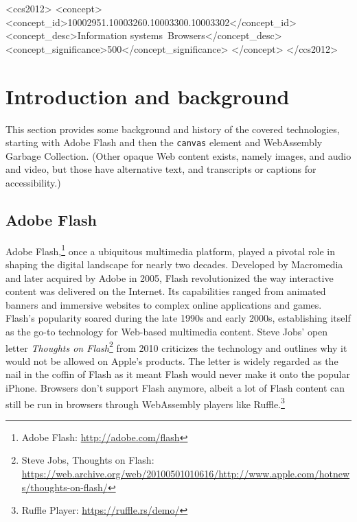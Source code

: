 \documentclass[sigconf]{acmart}
\begin{document}
\begin{CCSXML}
<ccs2012>
<concept>
<concept_id>10002951.10003260.10003300.10003302</concept_id>
<concept_desc>Information systems~Browsers</concept_desc>
<concept_significance>500</concept_significance>
</concept>
</ccs2012>
\end{CCSXML}



\maketitle

\section{Introduction and background}

This section provides some background and history of the covered technologies, starting with Adobe Flash and then the \texttt{canvas} element and WebAssembly Garbage Collection. (Other opaque Web content exists, namely images, and audio and video, but those have alternative text, and transcripts or captions for accessibility.)

\subsection{Adobe Flash}

Adobe Flash,\footnote{Adobe Flash: \url{http://adobe.com/flash}} once a ubiquitous multimedia platform, played a pivotal role in shaping the digital landscape for nearly two decades. Developed by Macromedia and later acquired by Adobe in 2005, Flash revolutionized the way interactive content was delivered on the Internet. Its capabilities ranged from animated banners and immersive websites to complex online applications and games. Flash's popularity soared during the late 1990s and early 2000s, establishing itself as the go-to technology for Web-based multimedia content. Steve Jobs' open letter \textit{Thoughts on Flash}\footnote{Steve Jobs, Thoughts on Flash: \url{https://web.archive.org/web/20100501010616/http://www.apple.com/hotnews/thoughts-on-flash/}} from 2010 criticizes the technology and outlines why it would not be allowed on Apple's products. The letter is widely regarded as the nail in the coffin of Flash as it meant Flash would never make it onto the popular iPhone. Browsers don't support Flash anymore, albeit a lot of Flash content can still be run in browsers through WebAssembly players like Ruffle.\footnote{Ruffle Player: \url{https://ruffle.rs/demo/}}
\end{document}
